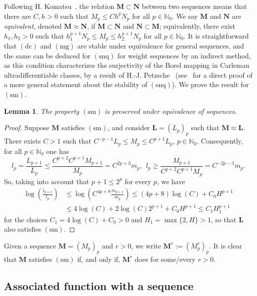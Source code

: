 \documentclass[11pt,a4paper]{article}
\theoremstyle{plain}
\newtheorem{lemma}[theorem]{Lemma}
\theoremstyle{definition}
\numberwithin{equation}{section}
\newcommand{\N}{\mathbb{N}}
\newcommand{\M}{{\boldsymbol{M}}}
\newcommand{\NN}{{\boldsymbol{N}}}
\newcommand{\LL}{{\boldsymbol{L}}}
\newcommand{\dc}{\operatorname{(dc)}}
\newcommand{\mg}{\operatorname{(mg)}}
\newcommand{\snq}{\operatorname{(snq)}}
\newcommand{\sm}{\operatorname{(sm)}}
\begin{document}
Following H. Komatsu~\cite{Komatsu}, the relation $\M \subset \NN$ between two sequences means that
there are $C,h > 0$ such that $M_p \leq Ch^pN_p$ for all $p \in \N_0$. We say $\M$ and $\NN$ are \emph{equivalent}, denoted  $\M \approx \NN$, if $\M \subset \NN$ and $\NN \subset \M$; equivalently, there exist $h_1,h_2>0$ such that $h_1^{p+1}N_p\le M_p \leq h_2^{p+1}N_p$ for all $p \in \N_0$. It is straightforward that $\dc$ and $\mg$ are stable under equivalence for general sequences, and the same can be deduced for $\snq$ for weight sequences by an indirect method, as this condition characterizes the surjectivity of the Borel mapping in Carleman ultradifferentiable classes, by a result of H.-J. Petzsche~\cite[Cor. 3.2]{Petzsche88} (see~\cite[Cor. 3.14]{JimenezSanzSchindlIndex} for a direct proof of a more general statement about the stability of $\snq$). We prove the result for $\sm$.

\begin{lemma}\label{lemma.sm-stable-equivalence}
The property $\sm$ is preserved under equivalence of sequences.
\end{lemma}

\begin{proof}
Suppose $\M$ satisfies $\sm$, and consider $\LL=(L_p)_p$ such that $\M\approx\LL$. There exists $C>1$ such that $C^{-p-1}L_p\le M_p\le C^{p+1}L_p$, $p\in\N_0$.
Consequently, for all $p\in\N_0$ one has
$$
l_p=\frac{L_{p+1}}{L_p}\le\frac{C^{p+2}C^{p+1}M_{p+1}}{M_p}=C^{2p+3}m_p,\ \ l_p\ge\frac{M_{p+1}}{C^{p+2}C^{p+1}M_p}=C^{-2p-3}m_p.
$$
So, taking into account that $p+1\le 2^p$ for every $p$, we have
\begin{align*}
\log\left(\frac{l_{p+1}}{l_p}\right)&\le \log\left(C^{4p+8}\frac{m_{p+1}}{m_p}\right)
\le(4p+8)\log(C)+C_0H^{p+1}\\
&\le 4\log(C)+2\log(C)2^{p+1}+C_0H^{p+1}\le C_1H_1^{p+1}
\end{align*}
for the choices $C_1=4\log(C)+C_0>0$ and $H_1=\max\{2,H\}>1$, so that $\LL$ also satisfies $\sm$.
\end{proof}

Given a sequence $\M=(M_p)_p$ and $r>0$, we write $\M^r:=(M_p^r)_p$. It is clear that $\M$ satisfies $\sm$ if, and only if, $\M^r$ does for some/every $r>0$.

\subsection{Associated function with a sequence}\label{subsectAssocFunctSeq}
\end{document}
